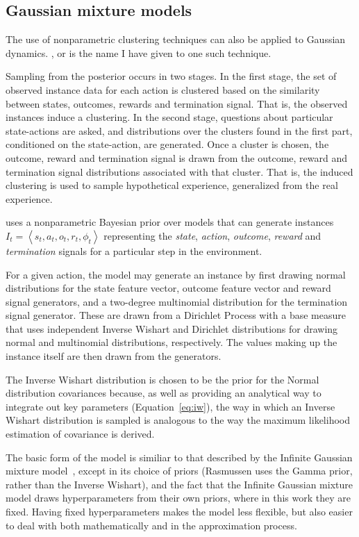 \subsection{Gaussian mixture models}

The use of nonparametric clustering techniques can also be applied to Gaussian dynamics. , or  is the name I have given to one such technique.

Sampling from the  posterior occurs in two stages. In the first stage, the set of observed instance data for each action is clustered based on the similarity between states, outcomes, rewards and termination signal. That is, the observed instances induce a clustering. In the second stage, questions about particular state-actions are asked, and distributions over the clusters found in the first part, conditioned on the state-action, are generated. Once a cluster is chosen, the outcome, reward and termination signal is drawn from the outcome, reward and termination signal distributions associated with that cluster. That is, the induced clustering is used to sample hypothetical experience, generalized from the real experience.

 uses a nonparametric Bayesian prior over models that can generate instances $I_t=\left<s_t, a_t, o_t, r_t, \phi_t\right>$ representing the \emph{state}, \emph{action}, \emph{outcome}, \emph{reward} and \emph{termination} signals for a particular step in the environment.

For a given action, the model may generate an instance by first drawing normal distributions for the state feature vector, outcome feature vector and reward signal generators, and a two-degree multinomial distribution for the termination signal generator. These are drawn from a Dirichlet Process with a base measure that uses independent Inverse Wishart and Dirichlet distributions for drawing normal and multinomial distributions, respectively. The values making up the instance itself are then drawn from the generators.

The Inverse Wishart distribution is chosen to be the prior for the Normal distribution covariances because, as well as providing an analytical way to integrate out key parameters (Equation~\ref{eq:iw}), the way in which an Inverse Wishart distribution is sampled is analogous to the way the maximum likelihood estimation of covariance is derived.

The basic form of the model is similiar to that described by the Infinite Gaussian mixture model~\cite{rasmussen00}, except in its choice of priors (Rasmussen uses the Gamma prior, rather than the Inverse Wishart), and the fact that the Infinite Gaussian mixture model draws hyperparameters from their own priors, where in this work they are fixed. Having fixed hyperparameters makes the model less flexible, but also easier to deal with both mathematically and in the approximation process.


